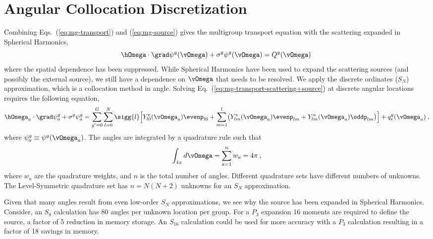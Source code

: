 \documentclass{article}
\numberwithin{equation}{subsection}
\begin{document}
\section{Angular Collocation Discretization}
\label{sec:angul-coll-discr}

Combining Eqs.~(\ref{eq:mg-transport}) and (\ref{eq:mg-source}) gives the
multigroup transport equation with the scattering expanded in Spherical
Harmonics,
\begin{equation}
  \hOmega\cdot\grad\psi^g(\vOmega) +
  \sigma^g\psi^g(\vOmega) = Q^g(\vOmega)\:
  \label{eq:mg-transport-scattering+source}
\end{equation}
where the spatial dependence has been suppressed.  While Spherical Harmonics
have been used to expand the scattering sources (and possibly the external
source), we still have a dependence on $\vOmega$ that needs to be resolved.
We apply the discrete ordinates ($S_N$) approximation, which is a collocation
method in angle.  Solving Eq.~(\ref{eq:mg-transport-scattering+source}) at
discrete angular locations requires the following equation,
\begin{equation}
    \hOmega_a\cdot\grad\psi^g_a +
    \sigma^g\psi^g_a
    =\sum_{g'=0}^G
    \sum_{l=0}^N
    \sigg{l}
    \Bigl[
    Y^e_{l0}(\vOmega_a)\evenp_{l0} +
    \sum_{m=1}^l
    \bigl(
    Y^e_{lm}(\vOmega_a)\evenp_{lm} +
    Y^o_{lm}(\vOmega_a)\oddp_{lm}
    \bigr)\Bigr]\\
    + q_e^g(\vOmega_a)\:,
    \label{eq:MG-SN-Equation}
 \end{equation}
where $\psi^g_a \equiv\psi^g(\vOmega_a)$.  The angles are integrated by a
quadrature rule such that
\begin{equation}
  \int_{4\pi}d\vOmega = \sum_{a=1}^{n}w_a = 4\pi\:,
\end{equation}
where $w_a$ are the quadrature weights, and $n$ is the total number of angles.
Different quadrature sets have different numbers of unknowns.  The
Level-Symmetric quadrature set has $n = N(N+2)$ unknowns for an $S_N$
approximation.

Given that many angles result from even low-order $S_N$ approximations, we see
why the source has been expanded in Spherical Harmonics.  Consider, an $S_8$
calculation has 80 angles per unknown location per group.  For a $P_3$
expansion 16 moments are required to define the source, a factor of 5
reduction in memory storage.  An $S_{16}$ calculation could be used for more
accuracy with a $P_3$ calculation resulting in a factor of 18 savings in
memory.
\end{document}
